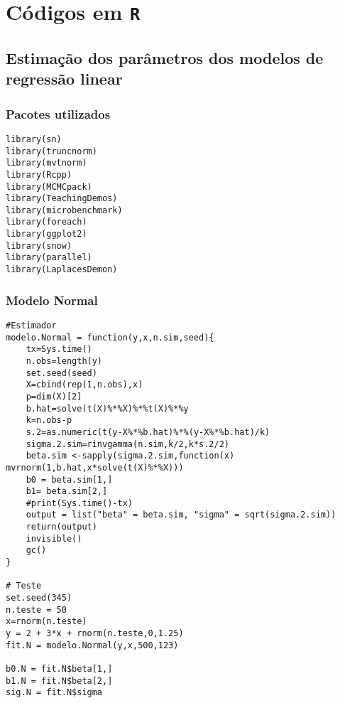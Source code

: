 \chapter{Códigos em \tt{R}}
\label{ape:codigos}

\section{Estimação dos parâmetros dos modelos de regressão linear}

\subsection{Pacotes utilizados}
\begin{lstlisting}
library(sn)
library(truncnorm)
library(mvtnorm)
library(Rcpp)
library(MCMCpack)
library(TeachingDemos)
library(microbenchmark)
library(foreach)
library(ggplot2)
library(snow)
library(parallel)
library(LaplacesDemon)
\end{lstlisting}

\subsection{Modelo Normal}
\begin{lstlisting}
#Estimador
modelo.Normal = function(y,x,n.sim,seed){
	tx=Sys.time()
	n.obs=length(y)
	set.seed(seed)
	X=cbind(rep(1,n.obs),x)
	p=dim(X)[2]
	b.hat=solve(t(X)%*%X)%*%t(X)%*%y
	k=n.obs-p
	s.2=as.numeric(t(y-X%*%b.hat)%*%(y-X%*%b.hat)/k)
	sigma.2.sim=rinvgamma(n.sim,k/2,k*s.2/2)
	beta.sim <-sapply(sigma.2.sim,function(x) mvrnorm(1,b.hat,x*solve(t(X)%*%X)))
	b0 = beta.sim[1,]
	b1= beta.sim[2,]
	#print(Sys.time()-tx)
	output = list("beta" = beta.sim, "sigma" = sqrt(sigma.2.sim))
	return(output)
    invisible()
	gc()
}

# Teste
set.seed(345)
n.teste = 50
x=rnorm(n.teste)
y = 2 + 3*x + rnorm(n.teste,0,1.25)
fit.N = modelo.Normal(y,x,500,123)

b0.N = fit.N$beta[1,]
b1.N = fit.N$beta[2,]
sig.N = fit.N$sigma
\end{lstlisting}


